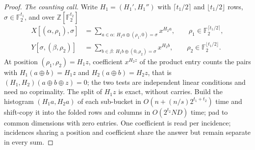 \documentclass[11pt]{article}
\begin{document}
\begin{proof}
\emph{The counting call.}  Write $H_1=(H_1',H_1'')$ with
$\lceil t_1/2\rceil$ and $\lfloor t_1/2\rfloor$ rows,
$\sigma\in\mathbb F_2^{t_1}$, and over $\mathbb Z[\mathbb F_2^{t_2}]$
\begin{align*}
 X[(\alpha,\rho_1),\sigma]&=\sum_{a\in\alpha:\ H_1a\oplus(\rho_1,0)=\sigma}
   x^{H_2a},\qquad\rho_1\in\mathbb F_2^{\lceil t_1/2\rceil},\\
 Y[\sigma,(\beta,\rho_2)]&=\sum_{b\in\beta:\ H_1b\oplus(0,\rho_2)=\sigma}
   x^{H_2b},\qquad\rho_2\in\mathbb F_2^{\lfloor t_1/2\rfloor}.
\end{align*}
At position $(\rho_1,\rho_2)=H_1z$, coefficient $x^{H_2z}$ of the
product entry counts the pairs with $H_1(a\oplus b)=H_1z$ and
$H_2(a\oplus b)=H_2z$, that is $(H_1,H_2)(a\oplus b\oplus z)=0$; the two
tests are independent linear conditions and need no coprimality.  The
split of $H_1z$ is exact, without carries.  Build the histogram
$(H_1a,H_2a)$ of each sub-bucket in $O(n+(n/s)2^{t_1+t_2})$ time and
shift-copy it into the folded rows and columns in $O(2^{t_2}ND)$ time;
pad to common dimensions with zero entries.  One coefficient is read per
incidence; incidences sharing a position and coefficient share the
answer but remain separate in every sum.
\end{proof}
\end{document}

